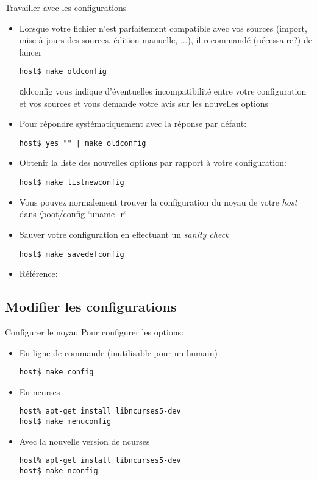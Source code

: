 \begin{frame}[fragile=singleslide]{Travailler avec les configurations}
  \begin{itemize} 
  \item  Lorsque  votre   fichier    n'est  parfaitement
    compatible  avec vos sources  (import, mise  à jours  des sources,
    édition manuelle, ...), il recommandé (nécessaire?) de lancer
    \begin{lstlisting} 
host$ make oldconfig
    \end{lstlisting} 
    \c{oldconfig}  vous  indique  d'éventuelles incompatibilité  entre
    votre configuration et vos sources  et vous demande votre avis sur
    les nouvelles options
  \item Pour répondre systématiquement avec la réponse par défaut:
    \begin{lstlisting} 
host$ yes "" | make oldconfig
    \end{lstlisting} 
  \item Obtenir  la liste  des nouvelles options  par rapport  à votre
    configuration:
   \begin{lstlisting} 
host$ make listnewconfig
   \end{lstlisting} 
 \item Vous  pouvez normalement trouver  la configuration du  noyau de
   votre \emph{host} dans \c{/boot/config-`uname -r`}
 \item Sauver votre configuration en effectuant un \emph{sanity check}
   \begin{lstlisting}  
host$ make savedefconfig
   \end{lstlisting} 
  \item Référence: 
 \end{itemize}
\end{frame} 

\subsection{Modifier les configurations}

\begin{frame}[fragile=singleslide]{Configurer le noyau}
 Pour configurer les options:
 \begin{itemize}    
 \item En ligne de commande (inutilisable pour un humain)
   \begin{lstlisting}
host$ make config
   \end{lstlisting} %
 \item En ncurses
   \begin{lstlisting}
host% apt-get install libncurses5-dev
host$ make menuconfig
   \end{lstlisting} %
 \item Avec la nouvelle version de ncurses 
   \begin{lstlisting}
host% apt-get install libncurses5-dev
host$ make nconfig
   \end{lstlisting} %
\end{itemize} 
\end{frame} 

